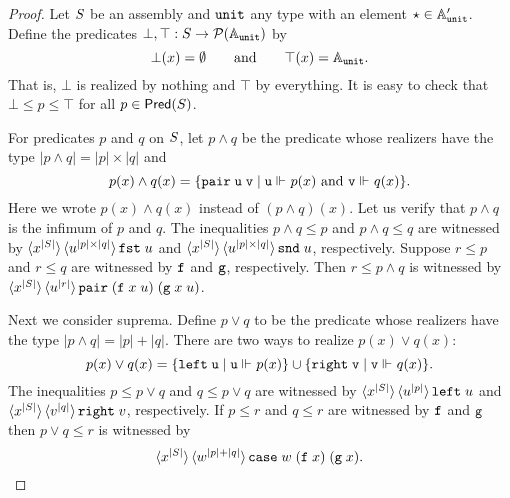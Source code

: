 \begin{proof}
  Let $S$ be an assembly and $\mathtt{unit}$ any type with an element
  ${\star} \in \mathbb{A}'_{\mathtt{unit}}$. Define the predicates $\bot, \top :
  S \to \mathcal{P}(\mathbb{A}_{\mathtt{unit}})$ by
  \begin{equation*}
    \bot(x) = \emptyset
    \qquad\text{and}\qquad
    \top(x) = \mathbb{A}_{\mathtt{unit}}.
  \end{equation*}
  That is, $\bot$ is realized by nothing and $\top$ by everything. It is
  easy to check that $\bot \leq p \leq \top$ for all $p \in
  \mathsf{Pred}(S)$.

  For predicates $p$ and $q$ on $S$, let $p \land q$ be the
  predicate whose realizers have the type $|p \land q| = |p| \times
  |q|$ and
  \begin{equation*}
    p(x) \land q(x) = \{\mathtt{pair}\;\mathtt{u}\;\mathtt{v} \mid
    \text{$\mathtt{u} \Vdash_{} p(x)$ and $\mathtt{v} \Vdash_{} q(x)$}\}.
  \end{equation*}
  Here we wrote $p(x) \land q(x)$ instead of $(p \land q)(x)$. Let us
  verify that $p \land q$ is the infimum of $p$ and $q$. The
  inequalities $p \land q \leq p$ and $p \land q \leq q$ are witnessed
  by $\langle x^{|S|} \rangle\, \langle u^{|p| \times |q|} \rangle\,{\mathtt{fst}\;u}$
  and $\langle x^{|S|} \rangle\, \langle u^{|p| \times
      |q|} \rangle\,{\mathtt{snd}\;u}$, respectively. Suppose $r \leq p$ and $r
  \leq q$ are witnessed by $\mathtt{f}$ and $\mathtt{g}$, respectively. Then $r
  \leq p \land q$ is witnessed by $\langle x^{|S|} \rangle\,
    \langle u^{|r|} \rangle\,{\mathtt{pair}\; (\mathtt{f}\;x\;u)\; (\mathtt{g}\;x\;u)}$.

  Next we consider suprema. Define $p \lor q$ to be the predicate
  whose realizers have the type $|p \land q| = |p| + |q|$. There are
  two ways to realize $p(x) \lor q(x)$:
  \begin{equation*}
    p(x) \lor q(x) =
    \{\mathtt{left}\;\mathtt{u} \mid \mathtt{u} \Vdash_{} p(x)\} \cup
    \{\mathtt{right}\;\mathtt{v} \mid \mathtt{v} \Vdash_{} q(x)\}.
  \end{equation*}
  The inequalities $p \leq p \lor q$ and $q \leq p \lor q$ are
  witnessed by $\langle x^{|S|} \rangle\, \langle u^{|p|} \rangle\,{\mathtt{left}\;u}$
  and $\langle x^{|S|} \rangle\, \langle v^{|q|} \rangle\,{\mathtt{right}\;v}$,
  respectively. If $p \leq r$ and $q \leq r$ are witnessed by $\mathtt{f}$
  and $\mathtt{g}$ then $p \lor q \leq r$ is witnessed by
  \begin{equation*}
    \langle x^{|S|} \rangle\, \langle w^{|p|+|q|} \rangle\,{
      \mathtt{case}\;w\;(\mathtt{f}\;x)\;(\mathtt{g}\;x)
    }.
  \end{equation*}
  

\end{proof}
